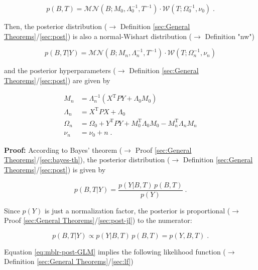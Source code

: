 \documentclass[a4paper,12pt,twoside]{book}
\begin{document}
\begin{equation} \label{eq:mblr-post-GLM-NW-prior}
p(B,T) = \mathcal{MN}(B; M_0, \Lambda_0^{-1}, T^{-1}) \cdot \mathcal{W}(T; \Omega_0^{-1}, \nu_0) \; .
\end{equation}

Then, the posterior distribution ($\rightarrow$ Definition \ref{sec:General Theorems}/\ref{sec:post}) is also a normal-Wishart distribution ($\rightarrow$ Definition "nw")

\begin{equation} \label{eq:mblr-post-GLM-NW-post}
p(B,T|Y) = \mathcal{MN}(B; M_n, \Lambda_n^{-1}, T^{-1}) \cdot \mathcal{W}(T; \Omega_n^{-1}, \nu_n)
\end{equation}

and the posterior hyperparameters ($\rightarrow$ Definition \ref{sec:General Theorems}/\ref{sec:post}) are given by

\begin{equation} \label{eq:mblr-post-GLM-NW-post-par}
\begin{split}
M_n &= \Lambda_n^{-1} (X^\mathrm{T} P Y + \Lambda_0 M_0) \\
\Lambda_n &= X^\mathrm{T} P X + \Lambda_0 \\
\Omega_n &= \Omega_0 + Y^\mathrm{T} P Y + M_0^\mathrm{T} \Lambda_0 M_0 - M_n^\mathrm{T} \Lambda_n M_n \\
\nu_n &= \nu_0 + n \; .
\end{split}
\end{equation}


\vspace{1em}
\textbf{Proof:} According to Bayes' theorem ($\rightarrow$ Proof \ref{sec:General Theorems}/\ref{sec:bayes-th}), the posterior distribution ($\rightarrow$ Definition \ref{sec:General Theorems}/\ref{sec:post}) is given by

\begin{equation} \label{eq:mblr-post-GLM-NG-BT}
p(B,T|Y) = \frac{p(Y|B,T) \, p(B,T)}{p(Y)} \; .
\end{equation}

Since $p(Y)$ is just a normalization factor, the posterior is proportional ($\rightarrow$ Proof \ref{sec:General Theorems}/\ref{sec:post-jl}) to the numerator:

\begin{equation} \label{eq:mblr-post-GLM-NG-post-JL}
p(B,T|Y) \propto p(Y|B,T) \, p(B,T) = p(Y,B,T) \; .
\end{equation}

Equation \eqref{eq:mblr-post-GLM} implies the following likelihood function ($\rightarrow$ Definition \ref{sec:General Theorems}/\ref{sec:lf})
\end{document}
